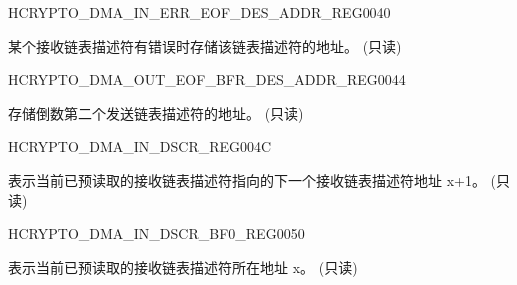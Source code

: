 \begin{register}{H}{CRYPTO\_DMA\_IN\_ERR\_EOF\_DES\_ADDR\_REG}{\hexprefix{}0040}\label{regdesc:CRYPTODMAINERREOFDESADDRREG}
%
\regnewline%
\begin{regdesc}\begin{reglist}
\label{fielddesc:CRYPTODMAINERREOFDESADDR}\item [CRYPTO\_DMA\_IN\_ERR\_EOF\_DES\_ADDR] 某个接收链表描述符有错误时存储该链表描述符的地址。 (只读)
\end{reglist}\end{regdesc}
\end{register}


\begin{register}{H}{CRYPTO\_DMA\_OUT\_EOF\_BFR\_DES\_ADDR\_REG}{\hexprefix{}0044}\label{regdesc:CRYPTODMAOUTEOFBFRDESADDRREG}
%
\regnewline%
\begin{regdesc}\begin{reglist}
\label{fielddesc:CRYPTODMAOUTEOFBFRDESADDR}\item [CRYPTO\_DMA\_OUT\_EOF\_BFR\_DES\_ADDR] 存储倒数第二个发送链表描述符的地址。 (只读)
\end{reglist}\end{regdesc}
\end{register}


\begin{register}{H}{CRYPTO\_DMA\_IN\_DSCR\_REG}{\hexprefix{}004C}\label{regdesc:CRYPTODMAINDSCRREG}
%
\regnewline%
\begin{regdesc}\begin{reglist}
\label{fielddesc:CRYPTODMAINLINKDSCR}\item [CRYPTO\_DMA\_INLINK\_DSCR] 表示当前已预读取的接收链表描述符指向的下一个接收链表描述符地址 x+1。 (只读)
\end{reglist}\end{regdesc}
\end{register}


\begin{register}{H}{CRYPTO\_DMA\_IN\_DSCR\_BF0\_REG}{\hexprefix{}0050}\label{regdesc:CRYPTODMAINDSCRBF0REG}
%
\regnewline%
\begin{regdesc}\begin{reglist}
\label{fielddesc:CRYPTODMAINLINKDSCRBF0}\item [CRYPTO\_DMA\_INLINK\_DSCR\_BF0] 表示当前已预读取的接收链表描述符所在地址 x。 (只读)
\end{reglist}\end{regdesc}
\end{register}


